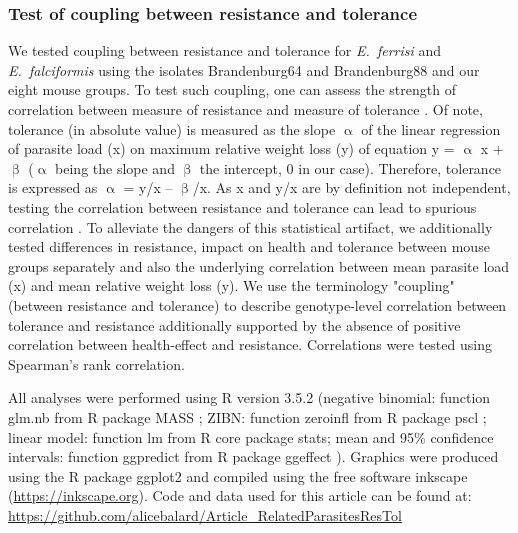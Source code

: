 \documentclass[12pt]{article}
\begin{document}
\subsubsection{Test of coupling between resistance and tolerance}

We tested coupling between resistance and tolerance for \textit{E.~ferrisi} and \textit{E.~falciformis }using the isolates Brandenburg64 and Brandenburg88 and our eight mouse groups. To test such coupling, one can assess the strength of correlation between measure of resistance and measure of tolerance \citep{raaberg_disentangling_2007}. Of note, tolerance (in absolute value) is measured as the slope $\upalpha$ of the linear regression of parasite load (x) on maximum relative weight loss (y) of equation y = $\upalpha$ x + $\upbeta$ ($\upalpha$ being the slope and $\upbeta$ the intercept, 0 in our case). Therefore, tolerance is expressed as $\upalpha$ = y/x – $\upbeta$/x. As x and y/x are by definition not independent, testing the correlation between resistance and tolerance can lead to spurious correlation \citep{Brett2004}. To alleviate the dangers of this statistical artifact, we additionally tested differences in resistance, impact on health and tolerance between mouse groups separately and also the underlying correlation between mean parasite load (x) and mean relative weight loss (y). We use the terminology "coupling" (between resistance and tolerance) to describe genotype-level correlation between tolerance and resistance additionally supported by the absence of positive correlation between health-effect and resistance. Correlations were tested using Spearman’s rank correlation.\par

All analyses were performed using R version 3.5.2 \citep{R_2010}(negative binomial: function glm.nb from R package MASS \citep{venables_modern_2002}; ZIBN: function zeroinfl from R package pscl \citep{Jackman2020, Zeileis2008}; linear model: function lm from R core package stats; mean and 95\% confidence intervals: function ggpredict from R package ggeffect \citep{Ldecke2018}). Graphics were prod\textcolor[HTML]{00000A}{uced using the R package ggplot2 \citep{wickham_ggplot2_2016} and compiled using the free software inkscape (\href{https://inkscape.org/}{https://inkscape.org}). Code and data used for this article can be found at: \href{https://github.com/alicebalard/Article_RelatedParasitesResTol}{https://github.com/alicebalard/Article\_RelatedParasitesResTol}}\par
\end{document}

